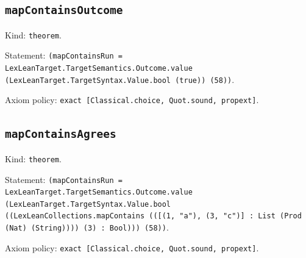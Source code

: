 \documentclass[11pt]{article}
\begin{document}
\subsection*{\texttt{mapContainsOutcome}}
\noindent Kind: \texttt{theorem}.\par
\noindent Statement: \texttt{(mapContainsRun = LexLeanTarget.TargetSemantics.Outcome.value (LexLeanTarget.TargetSyntax.Value.bool (true)) (58))}.\par
\noindent Axiom policy: \texttt{exact [Classical.choice, Quot.sound, propext]}.\par
\subsection*{\texttt{mapContainsAgrees}}
\noindent Kind: \texttt{theorem}.\par
\noindent Statement: \texttt{(mapContainsRun = LexLeanTarget.TargetSemantics.Outcome.value (LexLeanTarget.TargetSyntax.Value.bool ((LexLeanCollections.mapContains (([(1, "a"), (3, "c")] : List (Prod (Nat) (String)))) (3) : Bool))) (58))}.\par
\noindent Axiom policy: \texttt{exact [Classical.choice, Quot.sound, propext]}.\par
\end{document}

